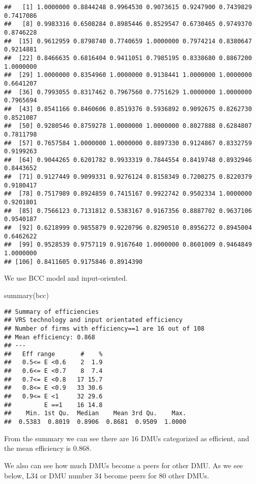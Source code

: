 \documentclass[
]{article}
\newenvironment{Shaded}{\begin{snugshade}}{\end{snugshade}}
\newcommand{\FunctionTok}[1]{\textcolor[rgb]{0.00,0.00,0.00}{#1}}
\newcommand{\NormalTok}[1]{#1}
\begin{document}
\begin{verbatim}
##   [1] 1.0000000 0.8844248 0.9964530 0.9073615 0.9247900 0.7439829 0.7417086
##   [8] 0.9983316 0.6508284 0.8985446 0.8529547 0.6730465 0.9749370 0.8746228
##  [15] 0.9612959 0.8798740 0.7740659 1.0000000 0.7974214 0.8380647 0.9214881
##  [22] 0.8466635 0.6816404 0.9411051 0.7985195 0.8338680 0.8867200 1.0000000
##  [29] 1.0000000 0.8354960 1.0000000 0.9138441 1.0000000 1.0000000 0.6641207
##  [36] 0.7993055 0.8317462 0.7967560 0.7751629 1.0000000 1.0000000 0.7965694
##  [43] 0.8541166 0.8460606 0.8519376 0.5936892 0.9092675 0.8262730 0.8521087
##  [50] 0.9280546 0.8759278 1.0000000 1.0000000 0.8027888 0.6284807 0.7811798
##  [57] 0.7657584 1.0000000 1.0000000 0.8897330 0.9124867 0.8332759 0.9199263
##  [64] 0.9044265 0.6201782 0.9933319 0.7844554 0.8419748 0.8932946 0.8443652
##  [71] 0.9127449 0.9099331 0.9276124 0.8158349 0.7200275 0.8220379 0.9180417
##  [78] 0.7517989 0.8924859 0.7415167 0.9922742 0.9502334 1.0000000 0.9201801
##  [85] 0.7566123 0.7131812 0.5383167 0.9167356 0.8887702 0.9637106 0.9540187
##  [92] 0.6218999 0.9855879 0.9220796 0.8290510 0.8956272 0.8945004 0.6462622
##  [99] 0.9528539 0.9757119 0.9167640 1.0000000 0.8601009 0.9464849 1.0000000
## [106] 0.8411605 0.9175846 0.8914390
\end{verbatim}

We use BCC model and input-oriented.

\begin{Shaded}
\begin{Highlighting}[]
\FunctionTok{summary}\NormalTok{(bcc)}
\end{Highlighting}
\end{Shaded}

\begin{verbatim}
## Summary of efficiencies
## VRS technology and input orientated efficiency
## Number of firms with efficiency==1 are 16 out of 108 
## Mean efficiency: 0.868 
## ---                
##   Eff range       #    %
##   0.5<= E <0.6    2  1.9
##   0.6<= E <0.7    8  7.4
##   0.7<= E <0.8   17 15.7
##   0.8<= E <0.9   33 30.6
##   0.9<= E <1     32 29.6
##         E ==1    16 14.8
##    Min. 1st Qu.  Median    Mean 3rd Qu.    Max. 
##  0.5383  0.8019  0.8906  0.8681  0.9509  1.0000
\end{verbatim}

From the summary we can see there are 16 DMUs categorized as efficient,
and the mean efficiency is 0.868.

We also can see how much DMUs become a peers for other DMU. As we see
below, L34 or DMU number 34 become peers for 80 other DMUs.
\end{document}
